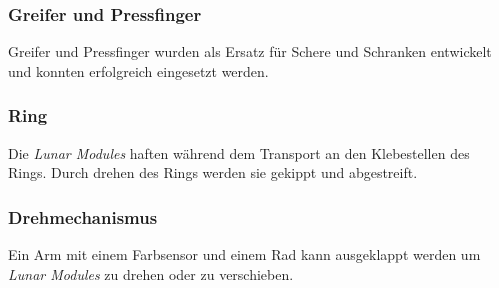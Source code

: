 \begin{frame}
	\frametitle{Greifer und Pressfinger}
	Greifer und Pressfinger wurden als Ersatz für Schere und Schranken entwickelt und konnten erfolgreich eingesetzt werden.
\end{frame}

\begin{frame}
	\frametitle{Ring}
	Die \textit{Lunar Modules} haften während dem Transport an den Klebestellen des Rings.
	Durch drehen des Rings werden sie gekippt und abgestreift.
\end{frame}

\begin{frame}
	\frametitle{Drehmechanismus}
	Ein Arm mit einem Farbsensor und einem Rad kann ausgeklappt werden um \textit{Lunar Modules} zu drehen oder zu verschieben.
\end{frame}